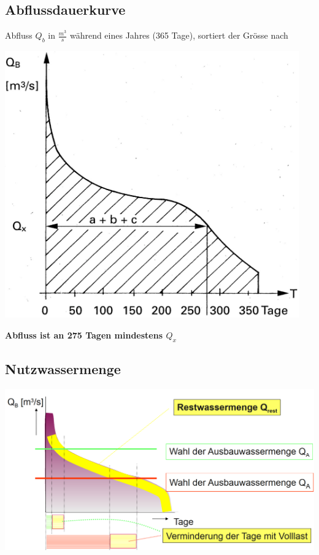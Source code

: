 \subsection{Abflussdauerkurve}
Abfluss $Q_b$ in $\frac{m^3}{s}$ während eines Jahres (365 Tage), sortiert der Grösse nach\\
\begin{minipage}[c]{0.48\columnwidth}
    \begin{center}
        \includegraphics[width=0.95\textwidth, align=c]{images/Abflussdauerkurve.png}
    \end{center}
\end{minipage}

\vspace{0.25cm}

\textbf{Abfluss ist an 275 Tagen mindestens $Q_x$}



\subsection{Nutzwassermenge}
\includegraphics[width=0.95\columnwidth, align=c]{images/Nutzwassermenge.png}

